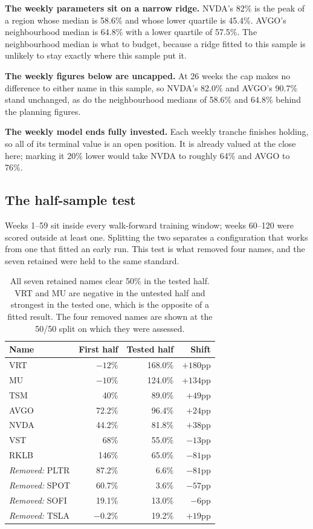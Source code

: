 \documentclass[11pt]{article}
\begin{document}
\textbf{The weekly parameters sit on a narrow ridge.} NVDA's 82\% is the peak of a region whose
median is 58.6\% and whose lower quartile is 45.4\%. AVGO's neighbourhood median is 64.8\% with a
lower quartile of 57.5\%. The neighbourhood median is what to budget, because a ridge fitted to
this sample is unlikely to stay exactly where this sample put it.

\textbf{The weekly figures below are uncapped.} At 26 weeks the cap makes no difference to
either name in this sample, so NVDA's 82.0\% and AVGO's 90.7\% stand unchanged, as do the
neighbourhood medians of 58.6\% and 64.8\% behind the planning figures.

\textbf{The weekly model ends fully invested.} Each weekly tranche finishes holding, so all of
its terminal value is an open position. It is already valued at the close here; marking it 20\%
lower would take NVDA to roughly 64\% and AVGO to 76\%.

\subsection{The half-sample test}

Weeks 1--59 sit inside every walk-forward training window; weeks 60--120 were scored outside at
least one. Splitting the two separates a configuration that works from one that fitted an early
run. This test is what removed four names, and the seven retained were held to the same standard.

\begin{table}[H]\centering\small
\begin{tabular}{lrrr}
\toprule
\textbf{Name} & \textbf{First half} & \textbf{Tested half} & \textbf{Shift}\\
\midrule
\rowcolor{bckeep} VRT  & $-12$\% & 168.0\% & $+180$pp\\
MU   & $-10$\% & 124.0\% & $+134$pp\\
\rowcolor{bckeep} TSM  & 40\%  & 89.0\%  & $+49$pp\\
AVGO & 72.2\%  & 96.4\%  & $+24$pp\\
\rowcolor{bckeep} NVDA & 44.2\%  & 81.8\%  & $+38$pp\\
VST  & 68\%  & 55.0\%  & $-13$pp\\
\rowcolor{bckeep} RKLB & 146\% & 65.0\%  & $-81$pp\\
\midrule
\rowcolor{bcwarn} \textit{Removed:} PLTR & 87.2\% & 6.6\% & $-81$pp\\
\rowcolor{bcwarn} \textit{Removed:} SPOT & 60.7\% & 3.6\% & $-57$pp\\
\rowcolor{bcwarn} \textit{Removed:} SOFI & 19.1\% & 13.0\% & $-6$pp\\
\rowcolor{bcwarn} \textit{Removed:} TSLA & $-0.2$\% & 19.2\% & $+19$pp\\
\bottomrule
\end{tabular}
\caption{All seven retained names clear 50\% in the tested half. VRT and MU are negative in the
untested half and strongest in the tested one, which is the opposite of a fitted result. The four
removed names are shown at the 50/50 split on which they were assessed.}
\end{table}
\end{document}
